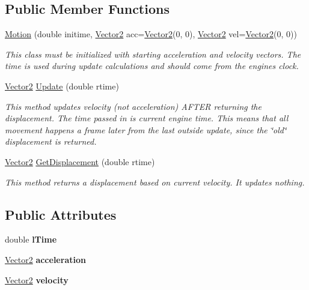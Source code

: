 \subsection*{Public Member Functions}
\begin{DoxyCompactItemize}
\item 
\hypertarget{class_motion_a4c7abd6f494d4c6900c41de832b3a81d}{}\label{class_motion_a4c7abd6f494d4c6900c41de832b3a81d} 
\hyperlink{class_motion_a4c7abd6f494d4c6900c41de832b3a81d}{Motion} (double initime, \hyperlink{class_vector2}{Vector2} acc=\hyperlink{class_vector2}{Vector2}(0, 0), \hyperlink{class_vector2}{Vector2} vel=\hyperlink{class_vector2}{Vector2}(0, 0))
\begin{DoxyCompactList}\small\item\em This class must be initialized with starting acceleration and velocity vectors. The time is used during update calculations and should come from the engine\textquotesingle{}s clock. \end{DoxyCompactList}\item 
\hypertarget{class_motion_aa4cda5dcd08b8854ee807e8413a268fc}{}\label{class_motion_aa4cda5dcd08b8854ee807e8413a268fc} 
\hyperlink{class_vector2}{Vector2} \hyperlink{class_motion_aa4cda5dcd08b8854ee807e8413a268fc}{Update} (double rtime)
\begin{DoxyCompactList}\small\item\em This method updates velocity (not acceleration) A\+F\+T\+ER returning the displacement. The time passed in is current engine time. This means that all movement happens a frame later from the last outside update, since the \char`\"{}old\char`\"{} displacement is returned. \end{DoxyCompactList}\item 
\hypertarget{class_motion_af91acfa4e8aba0be029f7a8716f9ee69}{}\label{class_motion_af91acfa4e8aba0be029f7a8716f9ee69} 
\hyperlink{class_vector2}{Vector2} \hyperlink{class_motion_af91acfa4e8aba0be029f7a8716f9ee69}{Get\+Displacement} (double rtime)
\begin{DoxyCompactList}\small\item\em This method returns a displacement based on current velocity. It updates nothing. \end{DoxyCompactList}\end{DoxyCompactItemize}
\subsection*{Public Attributes}
\begin{DoxyCompactItemize}
\item 
\hypertarget{class_motion_a07a9a3095b33bec14859fea515611174}{}\label{class_motion_a07a9a3095b33bec14859fea515611174} 
double {\bfseries l\+Time}
\item 
\hypertarget{class_motion_aee2de6ed8260b8aac72a68b03cf985c3}{}\label{class_motion_aee2de6ed8260b8aac72a68b03cf985c3} 
\hyperlink{class_vector2}{Vector2} {\bfseries acceleration}
\item 
\hypertarget{class_motion_ab1d630ea5dd81de4066665673bd422d6}{}\label{class_motion_ab1d630ea5dd81de4066665673bd422d6} 
\hyperlink{class_vector2}{Vector2} {\bfseries velocity}
\end{DoxyCompactItemize}


